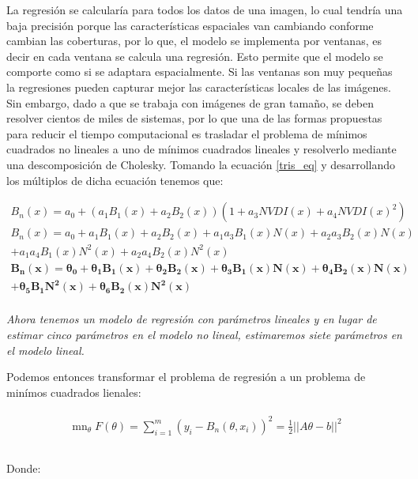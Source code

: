 La regresión se calcularía para todos los datos de una imagen, lo cual tendría una baja precisión porque las características espaciales van cambiando conforme cambian las coberturas, por lo que, el modelo se implementa por ventanas, es decir en cada ventana se calcula una regresión. Esto permite que el modelo se comporte como si se adaptara espacialmente. Si las ventanas son muy pequeñas la regresiones pueden capturar mejor las características locales de las imágenes. Sin  embargo, dado a que se trabaja con imágenes de gran tamaño, se deben resolver cientos de miles de sistemas, por lo que una de las formas propuestas para reducir el tiempo computacional es trasladar el problema de mínimos cuadrados no lineales a uno de mínimos cuadrados lineales y resolverlo mediante una descomposición de Cholesky. Tomando la ecuación \ref{tris_eq} y desarrollando los múltiplos de dicha ecuación tenemos que:

\begin{multline}
B_{n}(x) = a_{0} + (a_{1}B_{1}(x) + a_{2}B_{2}(x))(1 + a_{3}NVDI(x) + a_{4}NVDI(x)^{2}) \\
B_{n}(x) = a_{0} + a_{1}B_{1}(x) + a_{2}B_{2}(x) + a_{1}a_{3}B_{1}(x)N(x) + a_{2}a_{3}B_{2}(x)N(x) \\
 + a_{1}a_{4}B_{1}(x)N^{2}(x) + a_{2}a_{4}B_{2}(x)N^{2}(x) \\
\mathbf{B_{n}(x) =  \theta_{0} + \theta_{1}B_{1}(x) + \theta_{2}B_{2}(x) + \theta_{3}B_{1}(x)N(x) + \theta_{4}B_{2}(x)N(x)} \\
\mathbf{ + \theta_{5}B_{1}N^{2}(x) + \theta_{6}B_{2}(x)N^{2}(x)} \\ 
\end{multline}

\textit{Ahora tenemos un modelo de regresión con parámetros lineales y en lugar de estimar cinco parámetros en el modelo no lineal, estimaremos siete parámetros en el modelo lineal.}

Podemos entonces transformar el problema de regresión a un problema de minímos cuadrados lienales:  

\begin{multline}
\begin{aligned}
\mathop{m\acute{i}n}_{\theta} F (\theta)  = \sum_{i=1}^{m} (y_{i} - B_{n}(\theta, x_{i}))^{2} = \frac{1}{2} ||A\theta - b||^{2} \\ \\
\end{aligned}
\end{multline}

Donde: 

